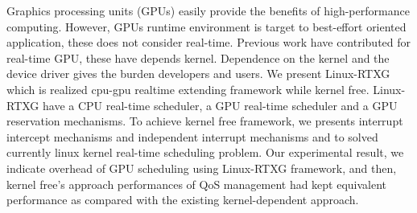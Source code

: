 Graphics processing units (GPUs) easily provide the benefits of high-performance computing.
However, GPUs runtime environment is target to best-effort oriented application, these does not consider real-time.
Previous work have contributed for real-time GPU, these have depends kernel.
Dependence on the kernel and the device driver gives the burden developers and users.
We present Linux-RTXG which is realized cpu-gpu realtime extending framework while kernel free.
Linux-RTXG have a CPU real-time scheduler, a GPU real-time scheduler and a GPU reservation mechanisms.
To achieve kernel free framework, 
we presents interrupt intercept mechanisms and independent interrupt mechanisms and to solved currently linux kernel real-time scheduling problem.
Our experimental result,
we indicate overhead of GPU scheduling using Linux-RTXG framework,
and then, kernel free's approach performances of QoS management had kept equivalent performance as compared with the existing kernel-dependent approach.
